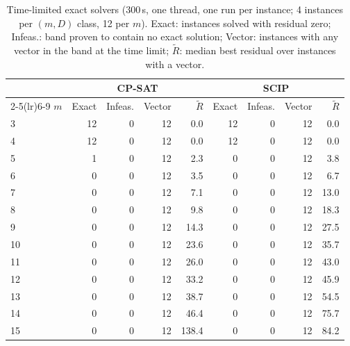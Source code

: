 \begin{table}[t]
\centering
\small
\caption{Time-limited exact solvers (300\,s, one thread, one run per instance; 4 instances per $(m,D)$ class, 12 per $m$). Exact: instances solved with residual zero; Infeas.: band proven to contain no exact solution; Vector: instances with any vector in the band at the time limit; $\tilde R$: median best residual over instances with a vector.}\label{tab:exact}
\begin{tabular}{lrrrrrrrr}
\toprule
 & \multicolumn{4}{c}{CP-SAT} & \multicolumn{4}{c}{SCIP} \\
\cmidrule(lr){2-5}\cmidrule(lr){6-9}
$m$ & Exact & Infeas. & Vector & $\tilde R$ & Exact & Infeas. & Vector & $\tilde R$ \\
\midrule
3 & 12 & 0 & 12 & 0.0 & 12 & 0 & 12 & 0.0 \\
4 & 12 & 0 & 12 & 0.0 & 12 & 0 & 12 & 0.0 \\
5 & 1 & 0 & 12 & 2.3 & 0 & 0 & 12 & 3.8 \\
6 & 0 & 0 & 12 & 3.5 & 0 & 0 & 12 & 6.7 \\
7 & 0 & 0 & 12 & 7.1 & 0 & 0 & 12 & 13.0 \\
8 & 0 & 0 & 12 & 9.8 & 0 & 0 & 12 & 18.3 \\
9 & 0 & 0 & 12 & 14.3 & 0 & 0 & 12 & 27.5 \\
10 & 0 & 0 & 12 & 23.6 & 0 & 0 & 12 & 35.7 \\
11 & 0 & 0 & 12 & 26.0 & 0 & 0 & 12 & 43.0 \\
12 & 0 & 0 & 12 & 33.2 & 0 & 0 & 12 & 45.9 \\
13 & 0 & 0 & 12 & 38.7 & 0 & 0 & 12 & 54.5 \\
14 & 0 & 0 & 12 & 46.4 & 0 & 0 & 12 & 75.7 \\
15 & 0 & 0 & 12 & 138.4 & 0 & 0 & 12 & 84.2 \\
\bottomrule
\end{tabular}
\end{table}

